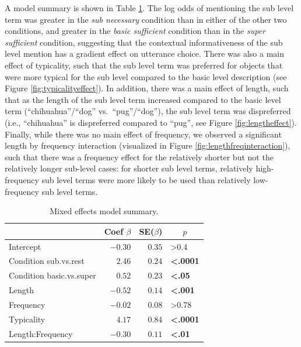\documentclass[10pt,letterpaper]{article}
\newcommand{\tableref}[1]{Table \ref{#1}}
\newcommand{\figref}[1]{Figure \ref{#1}}
\begin{document}
A model summary is shown in \tableref{tab:modelresults}. The log odds of mentioning the sub level term was greater in the \emph{sub necessary} condition than in either of the other two conditions, and greater in the \emph{basic sufficient} condition than in the \emph{super sufficient} condition, suggesting that the contextual informativeness of the sub level mention has a gradient effect on utterance choice. There was also a main effect of typicality, such that the sub level term was preferred for objects that were more typical for the sub level compared to the basic level  description (see \figref{fig:typicalityeffect}). In addition, there was a main effect of length, such that as the length of the sub level term increased compared to the basic level term (``chihuahua''/``dog'' vs.~``pug''/``dog''), the sub level term was dispreferred (i.e., ``chihuahua'' is dispreferred compared to ``pug'', see \figref{fig:lengtheffect}). Finally, while there was no main effect of frequency, we observed a significant length by frequency interaction (visualized in \figref{fig:lengthfreqinteraction}), such that there was a frequency effect for the relatively shorter but not the relatively longer sub-level cases: for shorter sub level terms, relatively high-frequency sub level terms were more likely to be used than relatively low-frequency sub level terms. 


\begin{table}[!tbp]
\caption{Mixed effects model summary.}
\begin{center}
\begin{tabular}{lrrl}
\toprule
\multicolumn{1}{l}{}&\multicolumn{1}{c}{Coef $\beta$}&\multicolumn{1}{c}{SE($\beta$)}&\multicolumn{1}{c}{$p$}\tabularnewline
\midrule
Intercept&$-0.30$&$0.35$&\textgreater0.4\tabularnewline
Condition sub.vs.rest&$ 2.46$&$0.24$&\textbf{\textless.0001}\tabularnewline
Condition basic.vs.super&$ 0.52$&$0.23$&\textbf{\textless.05}\tabularnewline
Length&$-0.52$&$0.14$&\textbf{\textless.001}\tabularnewline
Frequency&$-0.02$&$0.08$&\textgreater0.78\tabularnewline
Typicality&$ 4.17$&$0.84$&\textbf{\textless.0001}\tabularnewline
Length:Frequency&$-0.30$&$0.11$&\textbf{\textless.01}\tabularnewline
\bottomrule
\end{tabular}\end{center}
\label{tab:modelresults}
\end{table}
\end{document}
